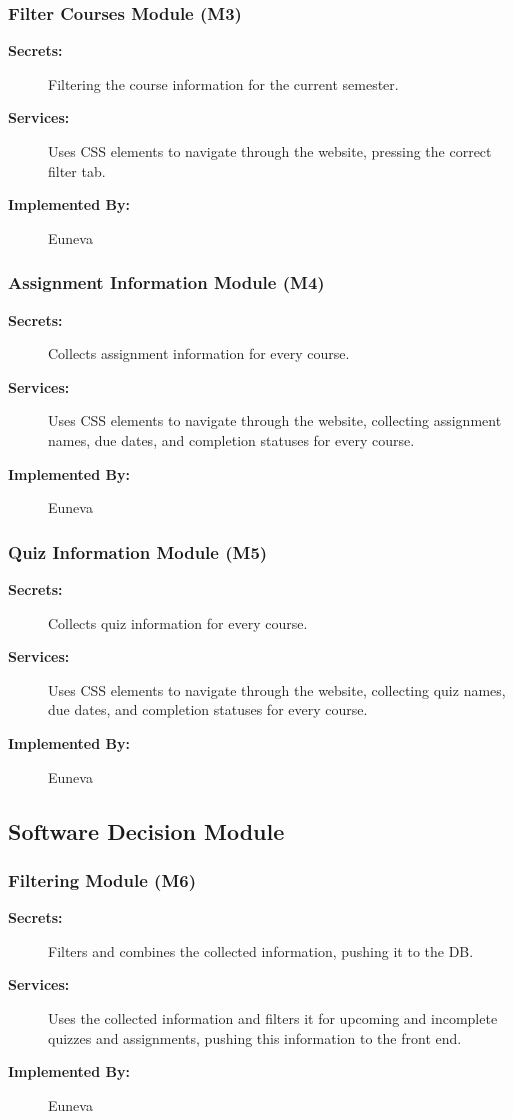 \documentclass[12pt, titlepage]{article}
\begin{document}
\subsubsection{Filter Courses Module (M3)}
\begin{description}
    \item[\textbf{Secrets:}] Filtering the course information for the current semester.
    \item[\textbf{Services:}] Uses CSS elements to navigate through the website, pressing the correct filter tab.
    \item[\textbf{Implemented By:}] Euneva
\end{description}

\subsubsection{Assignment Information Module (M4)}
\begin{description}
    \item[\textbf{Secrets:}] Collects assignment information for every course.
    \item[\textbf{Services:}] Uses CSS elements to navigate through the website, collecting assignment names, due dates, and completion statuses for every course.
    \item[\textbf{Implemented By:}] Euneva
\end{description}

\subsubsection{Quiz Information Module (M5)}
\begin{description}
    \item[\textbf{Secrets:}] Collects quiz information for every course.
    \item[\textbf{Services:}] Uses CSS elements to navigate through the website, collecting quiz names, due dates, and completion statuses for every course.
    \item[\textbf{Implemented By:}] Euneva
\end{description}

\subsection{Software Decision Module}
\subsubsection{Filtering Module (M6)}
\begin{description}
    \item[\textbf{Secrets:}] Filters and combines the collected information, pushing it to the DB.
    \item[\textbf{Services:}] Uses the collected information and filters it for upcoming and incomplete quizzes and assignments, pushing this information to the front end.
    \item[\textbf{Implemented By:}] Euneva
\end{description}
\end{document}

